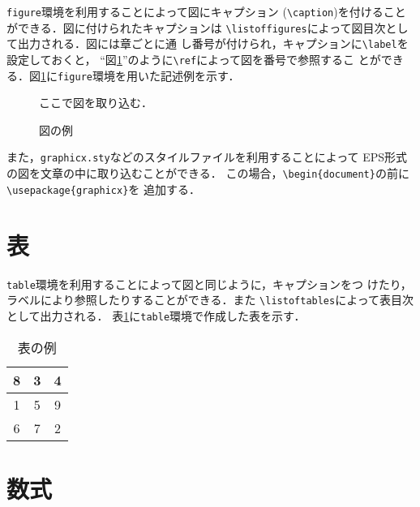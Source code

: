 \documentclass[11pt]{jreport}
\begin{document}
{\tt figure}環境を利用することによって図にキャプション
(\verb|\caption|)を付けることができる．図に付けられたキャプションは
\verb|\listoffigures|によって図目次として出力される．図には章ごとに通
し番号が付けられ，キャプションに\verb|\label|を設定しておくと，
``図\ref{fig:sample}''のように\verb|\ref|によって図を番号で参照するこ
とができる．図\ref{fig:sample}に{\tt figure}環境を用いた記述例を示す．

\begin{figure}
  \begin{center}
    ここで図を取り込む．
  \end{center}
  \caption{図の例}
  \label{fig:sample}
\end{figure}

また，{\tt graphicx.sty}などのスタイルファイルを利用することによって
EPS形式の図を文章の中に取り込むことができる．
この場合，\verb|\begin{document}|の前に\verb|\usepackage{graphicx}|を
追加する．

\section{表}

{\tt table}環境を利用することによって図と同じように，キャプションをつ
けたり，ラベルにより参照したりすることができる．また
\verb|\listoftables|によって表目次として出力される．
表\ref{tab:sample}に{\tt table}環境で作成した表を示す．

\begin{table}
  \caption{表の例}
  \label{tab:sample}
  \begin{center}
    \begin{tabular}{|c|c|c|}
      \hline
      8 & 3 & 4\\
      \hline
      1 & 5 & 9 \\
      \hline
      6 & 7 & 2 \\
      \hline
    \end{tabular}
  \end{center}
\end{table}

\section{数式}
\end{document}

